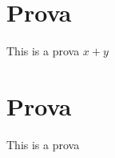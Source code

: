 \documentclass{article}
\begin{document}
\renewcommand\thesection{\titleFontdNzK{}\arabic{section}}
\newfontfamily{}
\newfontfamily{}
\section*{\titleFontdNzK{}Prova}
{\fontmwuA{}
    This is a prova $x+y$
}


\renewcommand\thesection{\titleFontxvqh{}\arabic{section}}
\newfontfamily{}
\newfontfamily{}
\section{\titleFontxvqh{}Prova}
{\fontBlnJ{}
    This is a prova
}
\end{document}
